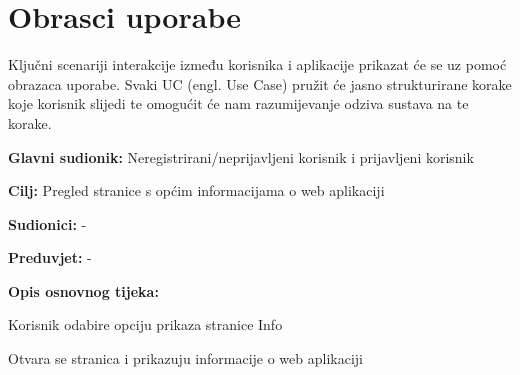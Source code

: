 \section{Obrasci uporabe}
Ključni scenariji interakcije između korisnika i aplikacije prikazat će se uz pomoć obrazaca uporabe. Svaki UC (engl. Use Case) pružit će jasno strukturirane korake koje korisnik slijedi te omogućit će nam razumijevanje odziva sustava na te korake. \\

\noindent {}
\begin{packed_item}
	
	\item \textbf{Glavni sudionik:} Neregistrirani/neprijavljeni korisnik i prijavljeni korisnik
	\item  \textbf{Cilj:} Pregled stranice s općim informacijama o web aplikaciji
	\item  \textbf{Sudionici:} -
	\item  \textbf{Preduvjet:} -
	\item  \textbf{Opis osnovnog tijeka:}
	
	\item[] \begin{packed_enum}
		
		\item Korisnik odabire opciju prikaza stranice Info
		\item Otvara se stranica i prikazuju informacije o web aplikaciji
		
	\end{packed_enum}						
\end{packed_item}

